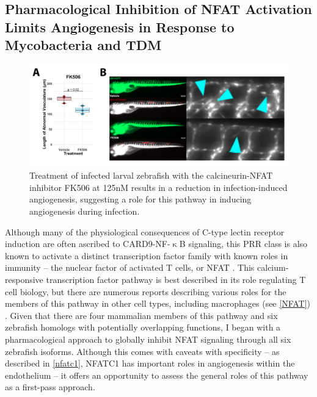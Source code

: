 \subsection{Pharmacological Inhibition of NFAT Activation Limits Angiogenesis in Response to Mycobacteria and TDM}

\begin{figure}
\centering
\includegraphics[width=\textwidth]{images/fk506inf.pdf}
\caption[FK506 treatment inhibits angiogenesis during infection]{Treatment of infected larval zebrafish with the calcineurin\hyp{}NFAT inhibitor FK506 at 125nM results in a reduction in infection\hyp{}induced angiogenesis, suggesting a role for this pathway in inducing angiogenesis during infection.}
\label{figure:fk506inf}
\end{figure}

Although many of the physiological consequences of C\hyp{}type lectin receptor induction are often ascribed to CARD9\hyp{}NF\hyp{}$\upkappa$B signaling, this PRR class is also known to activate a distinct transcription factor family with known roles in immunity -- the nuclear factor of activated T cells, or NFAT \citep{Goodridge2007, Deerhake2021}. This calcium\hyp{}responsive transcription factor pathway is best described in its role regulating T cell biology, but there are numerous reports describing various roles for the members of this pathway in other cell types, including macrophages (see \autoref{NFAT}) \citep{Symes1998, Jones2000, Crabtree2002, Horsley2002, Elloumi2012}. Given that there are four mammalian members of this pathway and six zebrafish homologs with potentially overlapping functions, I began with a pharmacological approach to globally inhibit NFAT signaling through all six zebrafish isoforms. Although this comes with caveats with specificity -- as described in \autoref{nfatc1}, NFATC1 has important roles in angiogenesis within the endothelium -- it offers an opportunity to assess the general roles of this pathway as a first\hyp{}pass approach. 

